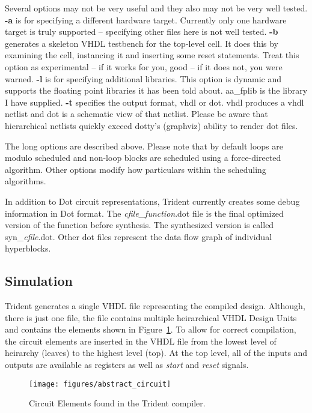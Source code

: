 Several options may not be very useful and they also may not be very
well tested.  \textbf{-a} is for specifying a different hardware target.
Currently only one hardware target is truly supported -- specifying
other files here is not well tested.  \textbf{-b} generates a skeleton VHDL
testbench for the top-level cell.  It does this by examining the cell,
instancing it and inserting some reset statements.  Treat this option
as experimental -- if it works for you, good -- if it does not, you
were warned.  \textbf{-l} is for specifying additional libraries.  This option
is dynamic and supports the floating point libraries it has been told
about.  aa\_fplib is the library I have supplied. \textbf{-t} specifies the
output format, vhdl or dot.  vhdl produces a vhdl netlist and dot is a
schematic view of that netlist.  Please be aware that hierarchical
netlists quickly exceed dotty's (graphviz) ability to render dot
files.

The long options are described above.  Please note that by default
loops are modulo scheduled and non-loop blocks are scheduled using a
force-directed algorithm.  Other options modify how particulars within
the scheduling algorithms.

In addition to Dot circuit representations, Trident currently creates
some debug information in Dot format.  The
\textit{cfile}\_\textit{function}.dot file is the final optimized
version of the function before synthesis. The synthesized version is
called syn\_\textit{cfile}.dot.  Other dot files represent the data
flow graph of individual hyperblocks.


\subsection{Simulation}

Trident generates a single VHDL file representing the compiled design.
Although, there is just one file, the file contains multiple
heirarchical VHDL Design Units and contains the elements shown in
Figure~\ref{fig:abs_circuit}.  To allow for correct compilation, the
circuit elements are inserted in the VHDL file from the lowest level
of heirarchy (leaves) to the highest level (top).  At the top level,
all of the inputs and outputs are available as registers as well as
\textit{start} and \textit{reset} signals.

\begin{figure}[ht]
\centering
\texttt{[image: figures/abstract\_circuit]}
\caption{\label{fig:abs_circuit} Circuit Elements found in the Trident compiler.}
\end{figure}

